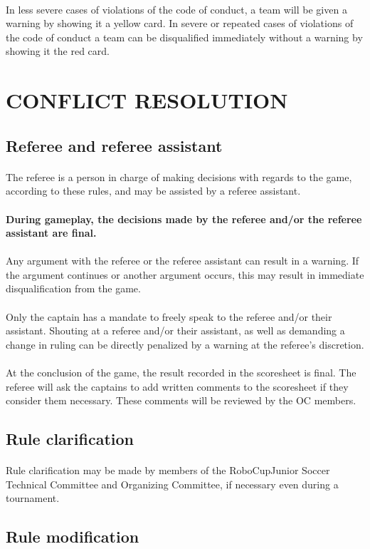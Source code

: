 \documentclass{article}
\newcommand*{\p}{\paragraph{}}
\begin{document}
\p In less severe cases of violations of the code of conduct, a team will be given
a warning by showing it a yellow card. In severe or repeated cases of
violations of the code of conduct a team can be disqualified immediately
without a warning by showing it the red card.

\section{CONFLICT RESOLUTION \label{ref-conflict-resolution}}

\subsection{Referee and referee assistant \label{ref-048}}

\p The referee is a person in charge of making decisions with regards to the game,
according to these rules, and may be assisted by a referee assistant.

\p \textbf{During gameplay, the decisions made by the referee and/or the referee assistant are final.}

\p Any argument with the referee or the referee assistant can result in a warning.
If the argument continues or another argument occurs, this may result in
immediate disqualification from the game.

\p Only the captain has a mandate to freely speak to the referee
and/or their assistant. Shouting at a referee and/or their assistant, as well
as demanding a change in ruling can be directly penalized by a warning at
the referee's discretion.

\p At the conclusion of the game, the result recorded in the scoresheet is final.
The referee will ask the captains to add written comments to the scoresheet if
they consider them necessary. These comments will be reviewed by the OC
members.

\subsection{Rule clarification \label{ref-049}}

\p Rule clarification may be made by members of the RoboCupJunior Soccer Technical
Committee and Organizing Committee, if necessary even during a tournament.

\subsection{Rule modification \label{ref-050}}
\end{document}
